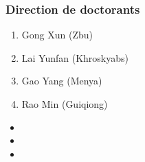 \documentclass[xcolor=table]{beamer}
\begin{document}
  \begin{frame} 
 \frametitle{Direction de doctorants} 

\begin{enumerate}
\item Gong Xun (Zbu)
\item Lai Yunfan (Khroskyabs)
\item Gao Yang (Menya)
\item Rao Min (Guiqiong)
\end{enumerate}

\begin{itemize}
\item  {}
\item  {}  
\item  {}
\end{itemize}   
  \end{frame}   
\end{document}
